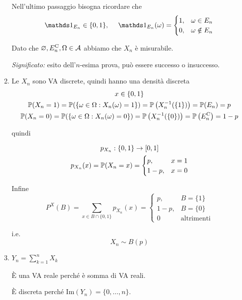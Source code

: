 \begin{enumerate}
Nell'ultimo passaggio bisogna ricordare che
\begin{equation*}
\Ind_{E_{n}} \in \{0,1\} ,\ \ \ \ \Ind_{E_{n}}( \omega ) =\begin{cases}
1, & \omega \in E_{n}\\
0, & \omega \notin E_{n}
\end{cases}
\end{equation*}

Dato che $\varnothing ,E_{n}^{\mathrm{C}} ,\Omega \in \mathcal{A}$ abbiamo che $X_{n}$ è misurabile.

\textit{Significato:} esito dell'$n$-esima prova, può essere successo o insuccesso.
\item Le $X_{n}$ sono VA discrete, quindi hanno una densità discreta
\begin{gather*}
x\in \{0,1\}\\
\mathbb{P}( X_{n} =1) =\mathbb{P}(\{\omega \in \Omega :X_{n}( \omega ) =1\}) =\mathbb{P}\left( X_{n}^{-1}(\{1\})\right) =\mathbb{P}( E_{n}) =p\\
\mathbb{P}( X_{n} =0) =\mathbb{P}(\{\omega \in \Omega :X_{n}( \omega ) =0\}) =\mathbb{P}\left( X_{n}^{-1}(\{0\})\right) =\mathbb{P}\left( E_{n}^{\mathrm{C}}\right) =1-p
\end{gather*}

quindi

\begin{gather*}
p_{X_{n}} :\{0,1\}\rightarrow [ 0,1]\\
p_{X_{n}}( x) =\mathbb{P}( X_{n} =x) =\begin{cases}
p, & x=1\\
1-p, & x=0
\end{cases}
\end{gather*}

Infine
\begin{equation*}
P^{X}( B) =\sum\limits _{x\in B\cap \{0,1\}} p_{X_{n}}( x) =\begin{cases}
p, & B=\{1\}\\
1-p, & B=\{0\}\\
0 & \text{altrimenti}
\end{cases}
\end{equation*}

i.e.\begin{equation*}
\boxed{X_{n} \sim B( p)}
\end{equation*}
\item $Y_{n} =\sum\limits _{k=1}^{n} X_{k}$

È una VA reale perché è somma di VA reali.

È discreta perché $\mathrm{Im}( Y_{n}) =\{0,\dots ,n\}$.


\end{enumerate}
